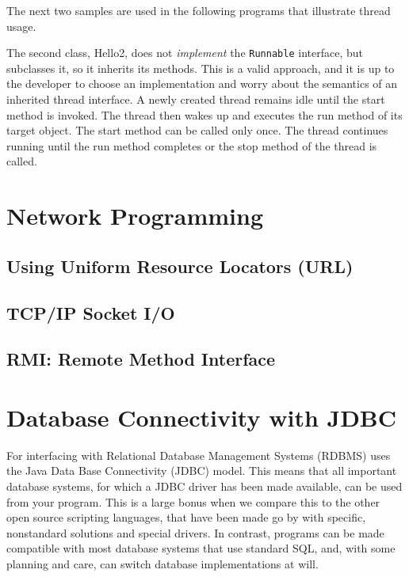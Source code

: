 The next two samples are used in the following programs that
illustrate thread usage.
 
 
The second class, Hello2, does not \emph{implement} the
\texttt{Runnable} interface, but subclasses it, so it inherits its
methods. This is a valid approach, and it is up to the developer to
choose an implementation and worry about the semantics of an inherited
thread interface.
A newly created thread remains idle until the start method is invoked. The thread then wakes up and executes the run method of its target object. The start method can be called only once. The thread continues running until the run method completes or the stop method of the thread is called.



\chapter{Network Programming}
\section{Using Uniform Resource Locators (URL)}
\section{TCP/IP Socket I/O}
\section{RMI: Remote Method Interface}

\chapter{Database Connectivity with JDBC}
For interfacing with Relational Database Management Systems (RDBMS)
\nr{} uses the Java Data Base Connectivity (JDBC) model. This means
that all important database systems, for which a JDBC driver has
been made available, can be used from your \nr{} program. This is a
large bonus when we compare this to the other open source scripting
languages, that have been made go by with specific, nonstandard
solutions and special drivers. In contrast, \nr{} programs can be
made compatible with most database systems that use standard SQL, and,
with some planning and care, can switch database implementations at
will.
 

